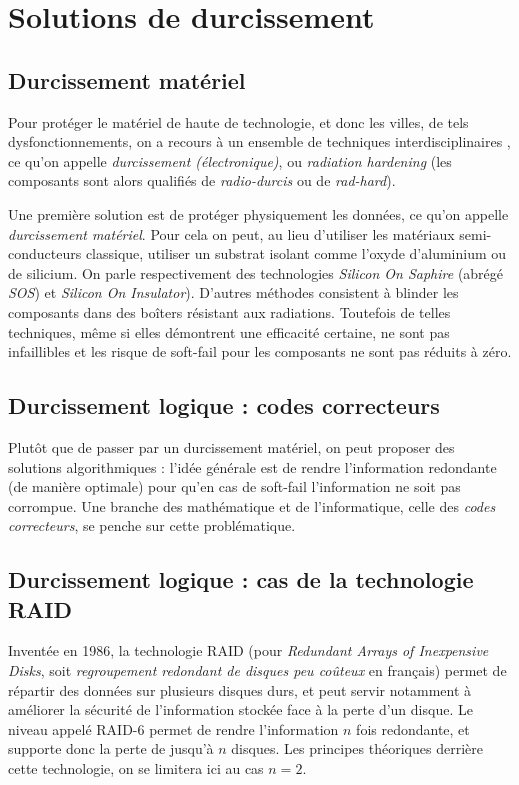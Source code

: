 \documentclass[a4paper,french,bookmarks]{article}
\begin{document}
    \section{Solutions de durcissement}

    \subsection{Durcissement matériel}

    Pour protéger le matériel de haute de technologie, et donc les villes, de tels dysfonctionnements, on a recours à un ensemble de techniques interdisciplinaires \cite{mittal16}, ce qu'on appelle \emph{durcissement (électronique)}, ou \emph{radiation hardening} (les composants sont alors qualifiés de \emph{radio-durcis} ou de \emph{rad-hard}).
    
    Une première solution est de protéger physiquement les données, ce qu'on appelle \emph{durcissement matériel}. Pour cela on peut, au lieu d'utiliser les matériaux semi-conducteurs classique, utiliser un substrat isolant comme l'oxyde d'aluminium ou de silicium. On parle respectivement des technologies \emph{Silicon On Saphire} (abrégé \emph{SOS}) et \emph{Silicon On Insulator})\cite{mittal16, shunkov20}. D'autres méthodes consistent à blinder les composants dans des boîters résistant aux radiations. Toutefois de telles techniques, même si elles démontrent une efficacité certaine, ne sont pas infaillibles et les risque de soft-fail pour les composants ne sont pas réduits à zéro.

    \subsection{Durcissement logique : codes correcteurs}

    Plutôt que de passer par un durcissement matériel, on peut proposer des solutions algorithmiques : l'idée générale est de rendre l'information redondante (de manière optimale) pour qu'en cas de soft-fail l'information ne soit pas corrompue. Une branche des mathématique et de l'informatique, celle des \emph{codes correcteurs}, se penche sur cette problématique.

    \subsection{Durcissement logique : cas de la technologie RAID}

    Inventée en 1986, la technologie \textsf{RAID} (pour \emph{Redundant Arrays of Inexpensive Disks}, soit \emph{regroupement redondant de disques peu coûteux} en français) permet de répartir des données sur plusieurs disques durs, et peut servir notamment à améliorer la sécurité de l'information stockée face à la perte d'un disque. Le niveau appelé \textsf{RAID-6} permet de rendre l'information $n$ fois redondante, et supporte donc la perte de jusqu'à $n$ disques. Les principes théoriques derrière cette technologie, on se limitera ici au cas $n = 2$. 
    
\end{document}
